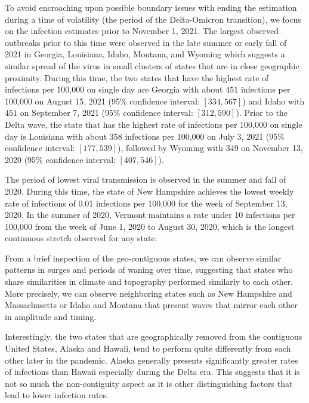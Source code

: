 To avoid encroaching upon possible boundary issues with ending the estimation
during a time of volatility (the period of the Delta-Omicron transition), we
focus on the infection estimates prior to November 1, 2021. The largest observed
outbreaks prior to this time were observed in the late summer or early fall of
2021 in Georgia, Louisiana, Idaho, Montana, and Wyoming which suggests a similar
spread of the virus in small clusters of states that are in close geographic
proximity. During this time, the two states that have the highest rate of
infections per 100,000 on single day are Georgia with about $451$ infections per
100,000 on August 15, 2021 (95\% confidence interval: $[334, 567]$) and Idaho
with $451$ on September 7, 2021 (95\% confidence interval: $[312, 590]$).  Prior
to the Delta wave, the state that has the highest rate of infections per 100,000
on single day is Louisiana with about 358 infections per 100,000 on July 3, 2021
(95\% confidence interval: $[177, 539]$), followed by Wyoming with 349 on
November 13, 2020 (95\% confidence interval: $[407, 546]$).

The period of lowest viral transmission is observed in the summer and fall of
2020. During this time, the state of New Hampshire achieves the lowest weekly
rate of infections of 0.01 infections per 100,000 for the week of September 13,
2020. In the summer of 2020, Vermont maintains a rate under 10 infections per
100,000 from the week of June 1, 2020 to August 30, 2020, which is the longest
continuous stretch observed for any state.

From a brief inspection of the geo-contiguous states, we can observe similar
patterns in surges and periods of waning over time, suggesting that states who
share similarities in climate and topography performed similarly to each other.
More precisely, we can observe neighboring states such as New Hampshire and
Massachusetts or Idaho and Montana that present waves that mirror each other in
amplitude and timing. 

Interestingly, the two states that are geographically removed from the
contiguous United States, Alaska and Hawaii, tend to perform quite differently
from each other later in the pandemic. Alaska generally presents significantly
greater rates of infections than Hawaii especially during the Delta era. This
suggests that it is not so much the non-contiguity aspect as it is other
distinguishing factors that lead to lower infection rates.
